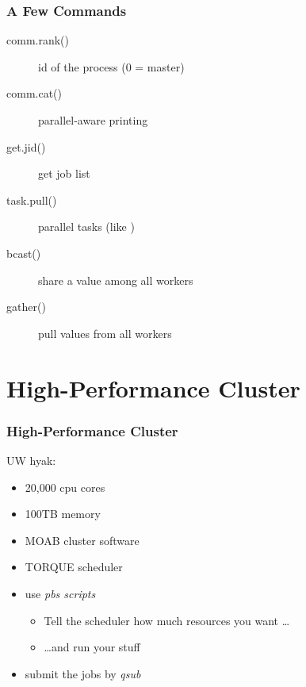\documentclass[pdftex]{beamer}
\begin{document}
\begin{frame}
  \frametitle{A Few Commands}
  \begin{description}
  \item[comm.rank()] id of the process (0 = master)
  \item[comm.cat()] parallel-aware printing
  \item[get.jid()] get job list
  \item[task.pull()] parallel tasks (like )
  \item[bcast()] share a value among all workers
  \item[gather()] pull values from all workers
  \end{description}
\end{frame}

\section[HPC]{High-Performance Cluster}

\begin{frame}
  \frametitle{High-Performance Cluster}
  UW hyak:
  \begin{itemize}
  \item 20,000 cpu cores
  \item 100TB memory
  \item MOAB cluster software
  \item TORQUE scheduler
  \item use \emph{pbs scripts}
    \begin{itemize}
    \item Tell the scheduler how much resources you want \dots
    \item \dots and run your stuff \smiley
    \end{itemize}
  \item submit the jobs by \emph{qsub}
  \end{itemize}
\end{frame}
\end{document}
